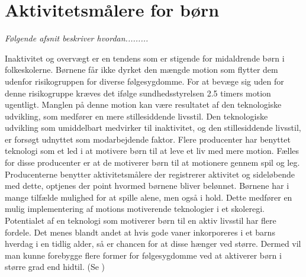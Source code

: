 \newpage
\section{Aktivitetsmålere for børn} \label{tracker_intro}
\textit{Følgende afsnit beskriver hvordan......... }

Inaktivitet og overvægt er en tendens som er stigende for midaldrende børn i folkeskolerne. Børnene får ikke dyrket den mængde motion som flytter dem udenfor risikogruppen for diverse følgesygdomme. For at bevæge sig uden for denne risikogruppe kræves det ifølge sundhedsstyrelsen 2.5 timers motion ugentligt. Manglen på denne motion kan være resultatet af den teknologiske udvikling, som medfører en mere stillesiddende livsstil. \citep{ObesityActionCoalition}  \newline 
Den teknologiske udvikling som umiddelbart medvirker til inaktivitet, og den stillesiddende livsstil, er forsøgt udnyttet som modarbejdende faktor. Flere producenter har benyttet teknologi som et led i at motivere børn til at leve et liv med mere motion. Fælles for disse producenter er at de motiverer børn til at motionere gennem spil og leg. Producenterne benytter aktivitetsmålere der registrerer aktivitet og sideløbende med dette, optjenes der point hvormed børnene bliver belønnet. Børnene har i mange tilfælde mulighed for at spille alene, men også i hold. Dette medfører en mulig implementering af motions motiverende teknologier i et skoleregi. \newline
Potentialet af en teknologi som motiverer børn til en aktiv livsstil har flere fordele. Det menes blandt andet at hvis gode vaner inkorporeres i et barns hverdag i en tidlig alder, så er chancen for at disse hænger ved større. Dermed vil man kunne forebygge flere former for følgesygdomme ved at aktiverer børn i større grad end hidtil. (Se )

